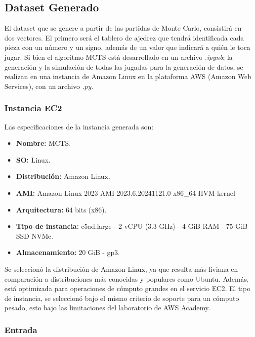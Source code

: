 \subsection{Dataset Generado}

El dataset que se genere a partir de las partidas de Monte Carlo, consistirá en dos vectores. El primero será el tablero de ajedrez que tendrá identificada cada pieza con un número y un signo, además de un valor que indicará a quién le toca jugar.\newline
Si bien el algoritmo MCTS está desarrollado en un archivo \textit{.ipynb}; la generación y la simulación de todas las jugadas para la generación de datos, se realizan en una instancia de Amazon Linux en la plataforma AWS (Amazon Web Services), con un archivo \textit{.py.}

\subsubsection{Instancia EC2}

Las especificaciones de la instancia generada son:
\begin{itemize}
    \item \textbf{Nombre:} MCTS.
    \item \textbf{SO:} Linux.
    \item \textbf{Distribución:} Amazon Linux.
    \item \textbf{AMI:} Amazon Linux 2023 AMI 2023.6.20241121.0 x86\_64 HVM kernel
    \item \textbf{Arquitectura:} 64 bits (x86).
    \item \textbf{Tipo de instancia:} c5ad.large - 2 vCPU (3.3 GHz) - 4 GiB RAM - 75 GiB SSD NVMe.
    \item \textbf{Almacenamiento:} 20 GiB - gp3.
\end{itemize}

Se seleccionó la distribución de Amazon Linux, ya que resulta más liviana en comparación a distribuciones más conocidas y populares como Ubuntu. Además, está optimizada para operaciones de cómputo grandes en el servicio EC2.\newline
El tipo de instancia, se seleccionó bajo el mismo criterio de soporte para un cómputo pesado, esto bajo las limitaciones del laboratorio de AWS Academy.

\subsubsection{Entrada}

